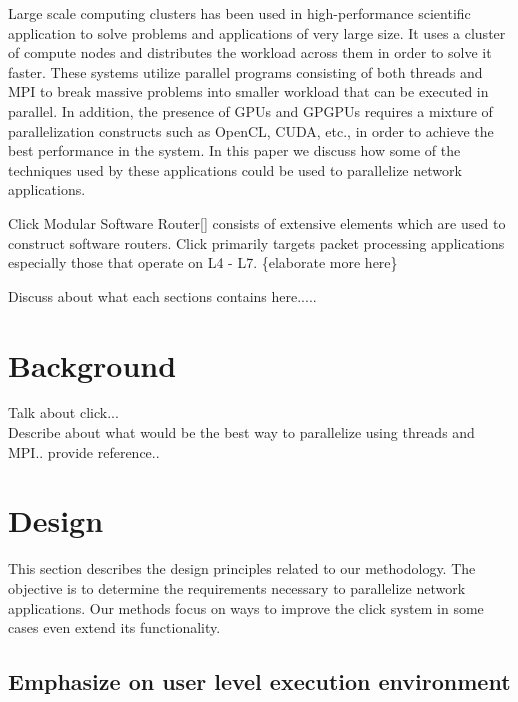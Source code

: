 \documentclass[conference]{IEEEtran}
\begin{document}
Large scale computing clusters has been used in high-performance scientific application to solve problems and applications of very large size. It uses a cluster of compute nodes and distributes the workload across them in order to solve it faster. These systems utilize parallel programs consisting of both threads and MPI to break massive problems into smaller workload that can be executed in parallel. In addition, the presence of GPUs and GPGPUs requires a mixture of parallelization constructs such as OpenCL, CUDA, etc., in order to achieve the best performance in the system. In this paper we discuss how some of the techniques used by these applications could be used to parallelize network applications.

Click Modular Software Router[] consists of extensive elements which are used to construct software routers. Click primarily targets packet processing applications especially those that operate on L4 - L7. \{elaborate more here\}

Discuss about what each sections contains here.....  

\section{Background}

Talk about click...\\

Describe about what would be the best way to parallelize using threads and MPI.. provide reference.. \\ 

\section{Design}

This section describes the design principles related to our methodology. The objective is to determine the requirements necessary to parallelize network applications. Our methods focus on ways to improve the click system in some cases even extend its functionality.

\subsection{Emphasize on user level execution environment}
\end{document}
